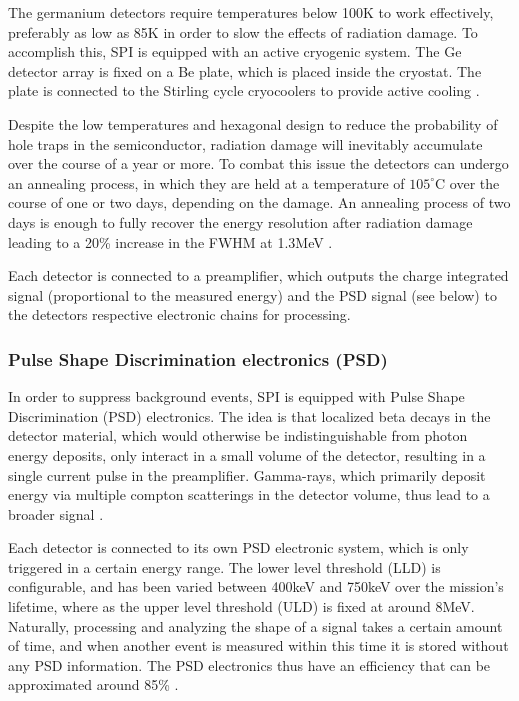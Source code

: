 \documentclass{report}
\begin{document}
The germanium detectors require temperatures below 100K to work effectively, preferably as low as 85K in order to slow the effects of radiation damage. To accomplish this, SPI is equipped with an active cryogenic system. The Ge detector array is fixed on a Be plate, which is placed inside the cryostat. The plate is connected to the Stirling cycle cryocoolers to provide active cooling \cite{refId0}. 

Despite the low temperatures and hexagonal design to reduce the probability of hole traps in the semiconductor, radiation damage will inevitably accumulate over the course of a year or more. To combat this issue the detectors can undergo an annealing process, in which they are held at a temperature of $105^\circ \text{C}$ over the course of one or two days, depending on the damage. An annealing process of two days is enough to fully recover the energy resolution after radiation damage leading to a 20\% increase in the FWHM at 1.3MeV \cite{refId0}.

Each detector is connected to a preamplifier, which outputs the charge integrated signal (proportional to the measured energy) and the PSD signal (see below) to the detectors respective electronic chains for processing.

\subsubsection*{Pulse Shape Discrimination electronics (PSD)}



In order to suppress background events, SPI is equipped with Pulse Shape Discrimination (PSD) electronics. The idea is that localized beta decays in the detector material, which would otherwise be indistinguishable from photon energy deposits, only interact in a small volume of the detector, resulting in a single current pulse in the preamplifier. Gamma-rays, which primarily deposit energy via multiple compton scatterings in the detector volume, thus lead to a broader signal \cite{refId0}. 

Each detector is connected to its own PSD electronic system, which is only triggered in a certain energy range. The lower level threshold (LLD) is configurable, and has been varied between 400keV and 750keV over the mission's lifetime, where as the upper level threshold (ULD) is fixed at around 8MeV. Naturally, processing and analyzing the shape of a signal takes a certain amount of time, and when another event is measured within this time it is stored without any PSD information. The PSD electronics thus have an efficiency that can be approximated around 85\% \cite{Roques}.
\end{document}
